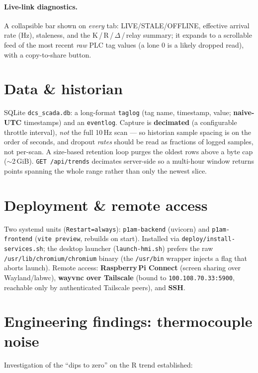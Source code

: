 \documentclass[11pt]{article}
\newcommand{\code}[1]{\texttt{#1}}
\begin{document}
\paragraph{Live-link diagnostics.} A collapsible bar shown on \emph{every} tab:
LIVE/STALE/OFFLINE, effective arrival rate (Hz), staleness, and the K\,/\,R\,/\,$\Delta$\,/\,relay
summary; it expands to a scrollable feed of the most recent \emph{raw} PLC tag
values (a lone 0 is a likely dropped read), with a copy-to-share button.

\section{Data \& historian}
SQLite \code{dcs\_scada.db}: a long-format \code{taglog} (tag name, timestamp,
value; \textbf{naive-UTC} timestamps) and an \code{eventlog}. Capture is
\textbf{decimated} (a configurable throttle interval), \emph{not} the full 10\,Hz
scan --- so historian sample spacing is on the order of seconds, and dropout
\emph{rates} should be read as fractions of logged samples, not per-scan. A
size-based retention loop purges the oldest rows above a byte cap ($\sim$2\,GiB).
\code{GET /api/trends} decimates server-side so a multi-hour window returns points
spanning the whole range rather than only the newest slice.

\section{Deployment \& remote access}
Two systemd units (\code{Restart=always}): \code{p1am-backend} (uvicorn) and
\code{p1am-frontend} (\code{vite preview}, rebuilds on start). Installed via
\code{deploy/install-services.sh}; the desktop launcher (\code{launch-hmi.sh})
prefers the raw \code{/usr/lib/chromium/chromium} binary (the \code{/usr/bin}
wrapper injects a flag that aborts launch). Remote access: \textbf{Raspberry\,Pi
Connect} (screen sharing over Wayland/labwc), \textbf{wayvnc over Tailscale}
(bound to \code{100.108.70.33:5900}, reachable only by authenticated Tailscale
peers), and \textbf{SSH}.

\section{Engineering findings: thermocouple noise}\label{sec:findings}
Investigation of the ``dips to zero'' on the R trend established:
\end{document}
